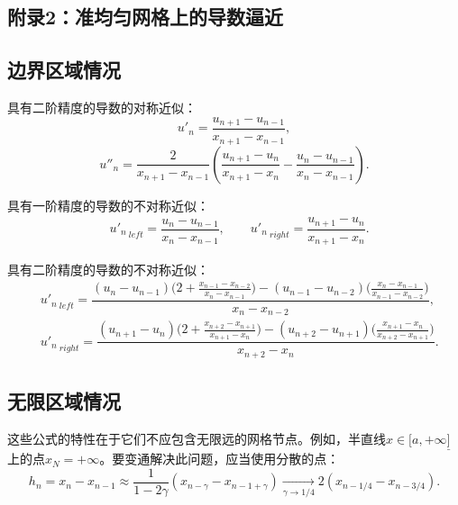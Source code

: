 \documentclass[twoside]{book}
\begin{document}
\begin{CJK*}{GBK}{song}
\section{附录2：准均匀网格上的导数逼近}\label{Appendix_5_b}

\subsection*{边界区域情况}
具有二阶精度的导数的对称近似：
\begin{equation*}
    u'_n = \dfrac{u_{n + 1} - u_{n - 1}}{x_{n + 1} - x_{n - 1}},
\end{equation*}
\begin{equation*}
    u''_n = \dfrac{2}{x_{n + 1} - x_{n - 1}}\left(\dfrac{u_{n + 1} - u_{n}}{x_{n + 1} - x_{n}} - \dfrac{u_{n} - u_{n - 1}}{x_{n} - x_{n - 1}}\right).
\end{equation*}

具有一阶精度的导数的不对称近似：
\begin{align*}
    &{u'_n}_{\: left} = \dfrac{u_{n} - u_{n - 1}}{x_{n} - x_{n - 1}}, \qquad {u'_n}_{\: right} = \dfrac{u_{n + 1} - u_{n}}{x_{n + 1} - x_{n}}.
\end{align*}

具有二阶精度的导数的不对称近似：
{\small
\begin{align*}
    &{u'_n}_{\: left} = \dfrac{(u_{n} - u_{n - 1})\Big(2 + \frac{x_{n - 1} - x_{n - 2}}{x_{n} - x_{n - 1}}\Big) - (u_{n - 1} - u_{n - 2})\Big(\frac{x_{n} - x_{n - 1}}{x_{n - 1} - x_{n - 2}}\Big)}{x_{n} - x_{n - 2}},\\
    &{u'_n}_{\: right} = \dfrac{(u_{n +1 } - u_{n})\Big(2 + \frac{x_{n + 2} - x_{n + 1}}{x_{n + 1} - x_{n}}\Big) - (u_{n + 2} - u_{n + 1})\Big(\frac{x_{n + 1} - x_{n}}{x_{n + 2} - x_{n + 1}}\Big)}{x_{n + 2} - x_{n}}.
\end{align*}
}

\subsection*{无限区域情况}

这些公式的特性在于它们不应包含无限远的网格节点。例如，半直线$x \in [a,+\infty\underline{]}$上的点$x_N = +\infty$。要变通解决此问题，应当使用分散的点：
\begin{equation*}
   h_n = x_n - x_{n - 1} \approx \dfrac{1}{1 - 2\gamma}(x_{n - \gamma} - x_{n - 1 + \gamma}) \underset{\gamma \to 1/4}{\longrightarrow} 2(x_{n - 1/4} - x_{n - 3/4}).
\end{equation*}


\end{CJK*}
\end{document}
